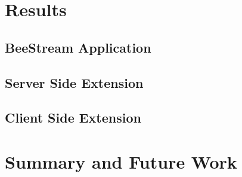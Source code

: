 \documentclass[12pt]{asu}
\begin{document}
	\chapter[Results]{\centering Results} \label{results}
	 \label{results_intro}
		\section{BeeStream Application}
		 \label{results_application}
		\section{Server Side Extension}
		 \label{results_server}
		\section{Client Side Extension}
		 \label{results_client}

	\chapter[Summary and Future Work]{\centering Summary and Future Work} \label{concl}
	 \label{concl}

	\newpage

  
	

	\appendix
	\fontsize{11pt}{26pt}\selectfont

	\newpage
		
\end{document}
